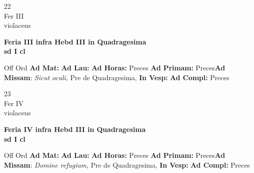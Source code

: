 \documentclass[10pt, openany]{book}
\begin{document}
    \begin{center}
        \begin{minipage}{3.5in}
            \vspace{2em}
            \begin{minipage}{0.5in}
                {\Huge 22} \\
                {\normalsize Fer III} \\
                {\normalsize violaceus}
            \end{minipage}
            \begin{minipage}{3.0in}
                \textbf{ \large Feria III infra Hebd III in Quadragesima \\
                \textnormal{\normalsize sd I cl}} \\ 
            \end{minipage}
            \begin{justify}Off Ord
                \textbf{Ad Mat: }
                \textbf{Ad Lau: }
                \textbf{Ad Horas: }Preces
                \textbf{Ad Primam: }Preces\textbf{Ad Missam}: \textit{Sicut oculi,} Pre de Quadragesima,  
                \textbf{In Vesp: }
                \textbf{Ad Compl: }Preces
            \end{justify}
        \end{minipage}
    \end{center}

    \begin{center}
        \begin{minipage}{3.5in}
            \vspace{2em}
            \begin{minipage}{0.5in}
                {\Huge 23} \\
                {\normalsize Fer IV} \\
                {\normalsize violaceus}
            \end{minipage}
            \begin{minipage}{3.0in}
                \textbf{ \large Feria IV infra Hebd III in Quadragesima \\
                \textnormal{\normalsize sd I cl}} \\ 
            \end{minipage}
            \begin{justify}Off Ord
                \textbf{Ad Mat: }
                \textbf{Ad Lau: }
                \textbf{Ad Horas: }Preces
                \textbf{Ad Primam: }Preces\textbf{Ad Missam}: \textit{Domine refugium,} Pre de Quadragesima,  
                \textbf{In Vesp: }
                \textbf{Ad Compl: }Preces
            \end{justify}
        \end{minipage}
    \end{center}
\end{document}
